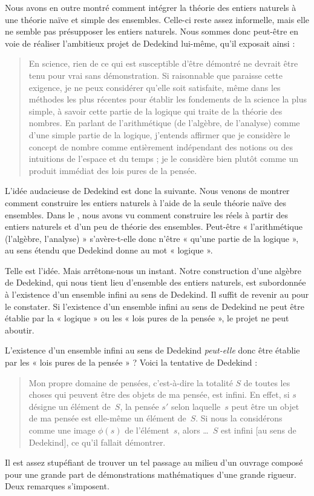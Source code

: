 \documentclass[11pt,a4paper,openany]{memoir}
\begin{document}
Nous avons en outre montré comment intégrer la théorie des entiers
naturels à une théorie naïve et simple des ensembles. Celle-ci reste
assez informelle, mais elle ne semble pas présupposer les entiers naturels.
Nous sommes donc peut-être en voie de réaliser l'ambitieux projet de
Dedekind lui-même, qu'il exposait ainsi :
\begin{quote}
En science, rien de ce qui est susceptible d'être démontré ne devrait
être tenu pour vrai sans démonstration. Si raisonnable que paraisse cette
exigence, je ne peux considérer qu'elle soit satisfaite, même dans les
méthodes les plus récentes pour établir les fondements de la science
la plus simple, à savoir cette partie de la logique qui traite de la
théorie des nombres. En parlant de l'arithmétique (de l'algèbre,
de l'analyse) comme d'une simple partie de la logique, j'entends affirmer
que je considère le concept de nombre comme entièrement indépendant
des notions ou des intuitions de l'espace et du temps ; je le considère
bien plutôt comme un produit immédiat des lois pures de la pensée.
\citep[préface]{Dedekind1888}
\end{quote}
L'idée audacieuse de Dedekind est donc la suivante. Nous venons de montrer
comment construire les entiers naturels à l'aide de la seule théorie
naïve des ensembles. Dans le ,
nous avons vu comment construire les réels à partir des entiers naturels
et d'un peu de théorie des ensembles. Peut-être « l'arithmétique
(l'algèbre, l'analyse) » s'avère-t-elle donc n'être « qu'une partie
de la logique », au sens étendu que Dedekind donne au mot « logique ».

Telle est l'idée. Mais arrêtons-nous un instant. Notre construction
d'une algèbre de Dedekind, qui nous tient lieu d'ensemble des entiers
naturels, est subordonnée à l'existence d'un ensemble infini au sens
de Dedekind. Il suffit de revenir au
pour le constater. Si l'existence d'un ensemble infini au sens de
Dedekind ne peut être établie par la « logique » ou les « lois pures
de la pensée », le projet ne peut aboutir.

L'existence d'un ensemble infini au sens de Dedekind \emph{peut-elle}
donc être établie par les « lois pures de la pensée » ? Voici la
tentative de Dedekind :
\begin{quote}
Mon propre domaine de pensées, c'est-à-dire la totalité $S$ de toutes
les choses qui peuvent être des objets de ma pensée, est infini.
En effet, si $s$ désigne un élément de~$S$, la pensée $s'$ selon
laquelle~$s$ peut être un objet de ma pensée est elle-même un élément
de~$S$. Si nous la considérons comme une image $\phi(s)$ de
l'élément~$s$, alors \dots~$S$ est infini [au sens de Dedekind],
ce qu'il fallait démontrer.
\citep[\S66]{Dedekind1888}
\end{quote}
Il est assez stupéfiant de trouver un tel passage au milieu d'un ouvrage
composé pour une grande part de démonstrations mathématiques d'une
grande rigueur. Deux remarques s'imposent.
\end{document}
